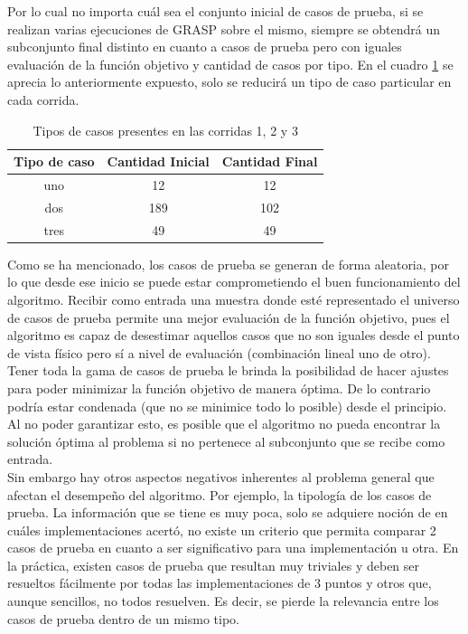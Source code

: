 \documentclass[a4paper,openright,11pt,oneside]{book}
\begin{document}
 	Por lo cual no importa cuál sea el conjunto inicial de casos de prueba, si se realizan varias ejecuciones de GRASP sobre el mismo, siempre se obtendrá un subconjunto final distinto en cuanto a casos de prueba pero con iguales evaluación de la función objetivo y cantidad de casos por tipo. En el cuadro \ref{tab:Tiposdecasos123} se aprecia lo anteriormente expuesto, solo se reducirá un tipo de caso particular en cada corrida. \\
 	
 	\begin{table}[h]
 		\begin{center}
 			\begin{tabular}{| c | c | c |} \hline
 				Tipo de caso & Cantidad Inicial & Cantidad Final \\ \hline
 				uno & 12 & 12 \\
 				dos & 189 & 102 \\
 				tres & 49 & 49 \\ \hline
 			\end{tabular}
 			\caption{Tipos de casos presentes en las corridas 1, 2 y 3}
 			\label{tab:Tiposdecasos123}
 		\end{center}
 	\end{table}
 
	Como se ha mencionado, los casos de prueba se generan de forma aleatoria, por lo que desde ese inicio se puede estar comprometiendo el buen funcionamiento del algoritmo. Recibir como entrada una muestra donde esté representado el universo de casos de prueba permite una mejor evaluación de la función objetivo, pues el algoritmo es capaz de desestimar aquellos casos que no son iguales desde el punto de vista físico pero sí a nivel de evaluación (combinación lineal uno de otro). Tener toda la gama de casos de prueba le brinda la posibilidad de hacer ajustes para poder minimizar la función objetivo de manera óptima. De lo contrario podría estar condenada (que no se minimice todo lo posible) desde el principio. Al no poder garantizar esto, es posible que el algoritmo no pueda encontrar la solución óptima al problema si no pertenece al subconjunto que se recibe como entrada. \\
	
	Sin embargo hay otros aspectos negativos inherentes al problema general que afectan el desempeño del algoritmo. Por ejemplo, la tipología de los casos de prueba. La información que se tiene es muy poca, solo se adquiere noción de en cuáles implementaciones acertó, no existe un criterio que permita comparar 2 casos de prueba en cuanto a ser significativo para una implementación u otra. En la práctica, existen casos de prueba que resultan muy triviales y deben ser resueltos fácilmente por todas las implementaciones de 3 puntos y otros que, aunque sencillos, no todos resuelven. Es decir, se pierde la relevancia entre los casos de prueba dentro de un mismo tipo. \\
	
\end{document}
